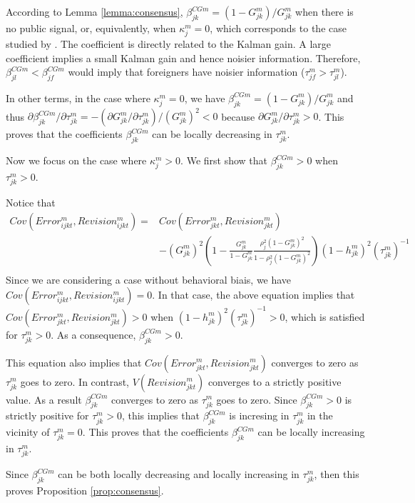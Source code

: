 According to Lemma \ref{lemma:consensus}, $\beta^{CGm}_{jk}=(1-G_{jk}^m)/G_{jk}^m$ when there is no public signal, or, equivalently, when $\kappa_j^m=0$, which corresponds to the case studied by \citet{CoibionGorodnichenko2015}. The coefficient is directly related to the Kalman gain. A large coefficient implies a small Kalman gain and hence noisier information. Therefore, $\beta^{CGm}_{jl}<\beta^{CGm}_{jf}$ would imply that foreigners have noisier information ($\tau_{jf}^m>\tau_{jl}^m$).

In other terms, in the case where $\kappa_j^m=0$, we have $\beta^{CGm}_{jk}=(1-G_{jk}^m)/G_{jk}^m$ and thus $\partial\beta^{CGm}_{jk}/\partial \tau_{jk}^m=-(\partial G_{jk}^m/\partial \tau_{jk}^m)/(G_{jk}^m)^2<0$ because $\partial G_{jk}^m/\partial \tau_{jk}^m>0$. This proves that the coefficients $\beta^{CGm}_{jk}$ can be locally decreasing in $\tau_{jk}^m$.

Now we focus on the case where $\kappa_j^m>0$. We first show that $\beta^{CGm}_{jk}>0$ when $\tau_{jk}^m>0$.

Notice that
$$\begin{array}{ll}Cov\left(Error_{ijkt}^m,Revision_{ijkt}^m\right) =&Cov\left(Error_{jkt}^m,Revision_{jkt}^m\right) \\
&-(G_{jk}^m)^2\left(1-\frac{G_{jk}^m}{1-G_{jk}^m}\frac{\rho_{j}^{2}(1-G_{jk}^m)^{2}}{1-\rho_{j}^{2}(1-G_{jk}^m)^{2}}\right)(1-h_{jk}^m)^2(\tau_{jk}^m)^{-1}\\
\end{array}$$
Since we are considering a case without behavioral biais, we have $Cov\left(Error_{ijkt}^m,Revision_{ijkt}^m\right)=0$. In that case, the above equation implies that $Cov\left(Error_{jkt}^m,Revision_{jkt}^m\right)>0$ when $(1-h_{jk}^m)^2(\tau_{jk}^m)^{-1}>0$, which is satisfied for $\tau_{jk}^m>0$. As a consequence, $\beta^{CGm}_{jk}>0$.

This equation also implies that $Cov\left(Error_{jkt}^m,Revision_{jkt}^m\right)$ converges to zero as $\tau_{jk}^m$ goes to zero. In contrast, $V(Revision_{jkt}^m)$ converges to a strictly positive value. As a result $\beta^{CGm}_{jk}$ converges to zero as $\tau_{jk}^m$ goes to zero. Since $\beta^{CGm}_{jk}>0$ is strictly positive for $\tau_{jk}^m>0$, this implies that $\beta^{CGm}_{jk}$ is incresing in $\tau_{jk}^m$ in the vicinity of $\tau_{jk}^m=0$. This proves that the coefficients $\beta^{CGm}_{jk}$ can be locally increasing in $\tau_{jk}^m$.

Since $\beta^{CGm}_{jk}$ can be both locally decreasing and locally increasing in $\tau_{jk}^m$, then this proves Proposition \ref{prop:consensus}.

